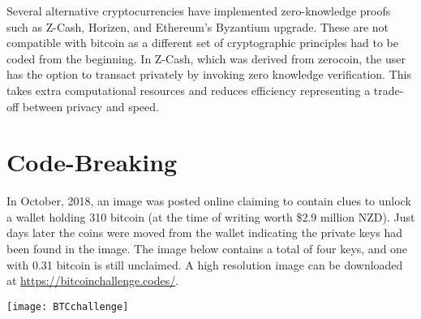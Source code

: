 Several alternative cryptocurrencies have implemented zero-knowledge proofs such as Z-Cash, Horizen, and Ethereum's Byzantium upgrade. These are not compatible with bitcoin as a different set of cryptographic principles had to be coded from the beginning. In Z-Cash, which was derived from zerocoin, the user has the option to transact privately by invoking zero knowledge verification. This takes extra computational resources and reduces efficiency representing a trade-off between privacy and speed.


\section*{Code-Breaking}\label{Se:code-breaking}
In October, 2018, an image was posted online claiming to contain clues to unlock a wallet holding 310 bitcoin (at the time of writing worth \$2.9 million NZD). Just days later the coins were moved from the wallet indicating the private keys had been found in the image. The image below contains a total of four keys, and one with 0.31 bitcoin is still unclaimed. A high resolution image can be downloaded at \url{https://bitcoinchallenge.codes/}.
\begin{center}
	\texttt{[image: BTCchallenge]}
\end{center}
%
%
%
%
